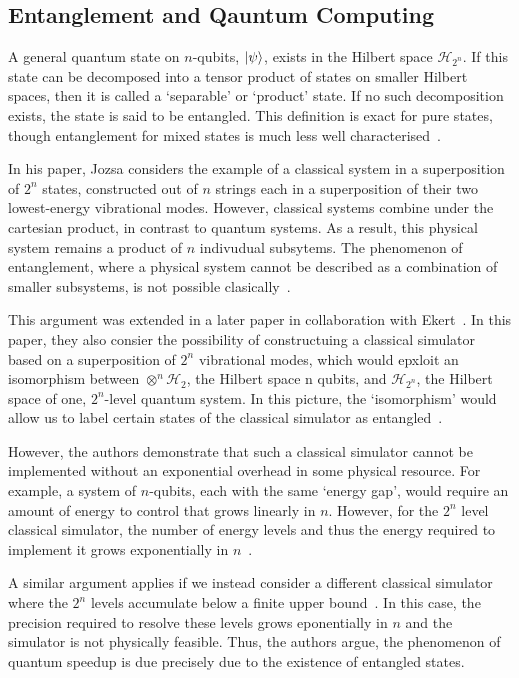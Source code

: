 \documentclass{standalone}
\begin{document}
\subsection{Entanglement and Qauntum Computing}\label{sec:entanglement}
A general quantum state on $n$-qubits, $\ket{\psi}$, exists in the Hilbert space $\mathcal{H}_{2^{n}}$. If this state can be decomposed into a tensor product of states on smaller Hilbert spaces, then it is called a `separable' or `product' state. If no such decomposition exists, the state is said to be entangled. This definition is exact for pure states, though entanglement for mixed states is much less well characterised~\cite{Laflamme2001}. 
\par
In his paper, Jozsa considers the example of a classical system in a superposition of $2^{n}$ states, constructed out of $n$ strings each in a superposition of their two lowest-energy vibrational modes. However, classical systems combine under the cartesian product, in contrast to quantum systems. As a result, this physical system remains a product of $n$ indivudual subsytems. The phenomenon of entanglement, where a physical system cannot be described as a combination of smaller subsystems, is not possible clasically~\cite{Jozsa1997}. 
\par
This argument was extended in a later paper in collaboration with Ekert~\cite{Ekert1998}. In this paper, they also consier the possibility of constructuing a classical simulator based on a superposition of $2^{n}$ vibrational modes, which would epxloit an isomorphism between $\otimes^{n}\mathcal{H}_{2}$, the Hilbert space n qubits, and $\mathcal{H}_{2^{n}}$, the Hilbert space of one, $2^{n}$-level quantum system. In this picture, the `isomorphism' would allow us to label certain states of the classical simulator as entangled~\cite{Ekert1998}. 
\par
However, the authors demonstrate that such a classical simulator cannot be implemented without an exponential overhead in some physical resource. For example, a system of $n$-qubits, each with the same `energy gap', would require an amount of energy to control that grows linearly in $n$. However, for the $2^{n}$ level classical simulator, the number of energy levels and thus the energy required to implement it grows exponentially in $n$~\cite{Ekert1998}.
\par
A similar argument applies if we instead consider a different classical simulator where the $2^{n}$ levels accumulate below a finite upper bound~\cite{Jozsa2003}. In this case, the precision required to resolve these levels grows eponentially in $n$ and the simulator is not physically feasible. Thus, the authors argue, the phenomenon of quantum speedup is due precisely due to the existence of entangled states.  
\end{document}
